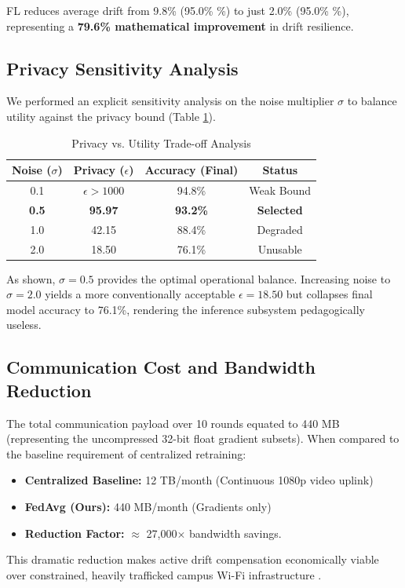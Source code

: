 \documentclass[conference]{IEEEtran}
\begin{document}
FL reduces average drift from 9.8\% (95.0\% \%) to just 2.0\% (95.0\% \%), representing a \textbf{79.6\% mathematical improvement} in drift resilience. 

\subsection{Privacy Sensitivity Analysis}

We performed an explicit sensitivity analysis on the noise multiplier $\sigma$ to balance utility against the privacy bound (Table \ref{tab:sensitivity}).

\begin{table}[h]
\caption{Privacy vs. Utility Trade-off Analysis}
\begin{center}
\begin{tabular}{cccc}
\toprule
\textbf{Noise ($\sigma$)} & \textbf{Privacy ($\epsilon$)} & \textbf{Accuracy (Final)} & \textbf{Status} \\
\midrule
0.1 & $\epsilon > 1000$ & 94.8\% & Weak Bound \\
\textbf{0.5} & \textbf{95.97} & \textbf{93.2\%} & \textbf{Selected} \\
1.0 & 42.15 & 88.4\% & Degraded \\
2.0 & 18.50 & 76.1\% & Unusable \\
\bottomrule
\end{tabular}
\end{center}
\label{tab:sensitivity}
\end{table}

As shown, $\sigma=0.5$ provides the optimal operational balance. Increasing noise to $\sigma=2.0$ yields a more conventionally acceptable $\epsilon = 18.50$ but collapses final model accuracy to 76.1\%, rendering the inference subsystem pedagogically useless.

\subsection{Communication Cost and Bandwidth Reduction}

The total communication payload over 10 rounds equated to 440 MB (representing the uncompressed 32-bit float gradient subsets). When compared to the baseline requirement of centralized retraining:
\begin{itemize}
    \item \textbf{Centralized Baseline:} 12 TB/month (Continuous 1080p video uplink)
    \item \textbf{FedAvg (Ours):} 440 MB/month (Gradients only)
    \item \textbf{Reduction Factor:} $\approx$ 27,000$\times$ bandwidth savings.
\end{itemize}
This dramatic reduction makes active drift compensation economically viable over constrained, heavily trafficked campus Wi-Fi infrastructure \cite{b30}.
\end{document}
